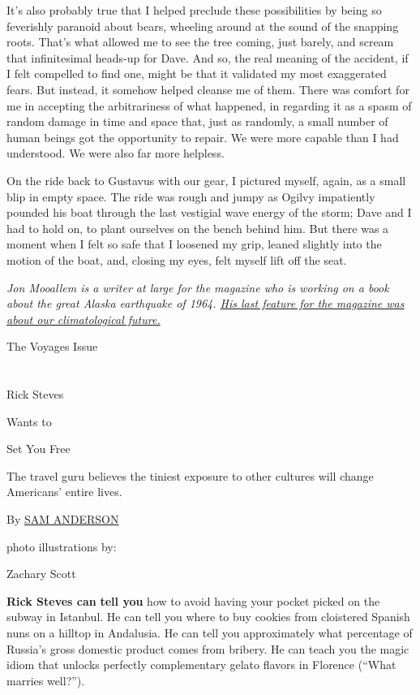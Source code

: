 It's also probably true that I helped preclude these possibilities by
being so feverishly paranoid about bears, wheeling around at the sound
of the snapping roots. That's what allowed me to see the tree coming,
just barely, and scream that infinitesimal heads-up for Dave. And so,
the real meaning of the accident, if I felt compelled to find one, might
be that it validated my most exaggerated fears. But instead, it somehow
helped cleanse me of them. There was comfort for me in accepting the
arbitrariness of what happened, in regarding it as a spasm of random
damage in time and space that, just as randomly, a small number of human
beings got the opportunity to repair. We were more capable than I had
understood. We were also far more helpless.

On the ride back to Gustavus with our gear, I pictured myself, again, as
a small blip in empty space. The ride was rough and jumpy as Ogilvy
impatiently pounded his boat through the last vestigial wave energy of
the storm; Dave and I had to hold on, to plant ourselves on the bench
behind him. But there was a moment when I felt so safe that I loosened
my grip, leaned slightly into the motion of the boat, and, closing my
eyes, felt myself lift off the seat.

\emph{Jon Mooallem is a writer at large for the magazine who is working
on a book about the great Alaska earthquake of 1964.
\href{https://www.nytimes3xbfgragh.onion/2017/04/19/magazine/our-climate-future-is-actually-our-climate-present.html}{His
last feature for the magazine was about our climatological future.}}

The Voyages Issue

\hypertarget{-3}{%
\section{}\label{-3}}

Rick Steves

Wants to

Set You Free

 The travel guru believes the tiniest exposure to other cultures will
change Americans' entire lives.

By \href{https://www.nytimes3xbfgragh.onion/by/sam-anderson}{SAM
ANDERSON}

photo illustrations by:

Zachary Scott

\textbf{Rick Steves can} \textbf{tell you} how to avoid having your
pocket picked on the subway in Istanbul. He can tell you where to buy
cookies from cloistered Spanish nuns on a hilltop in Andalusia. He can
tell you approximately what percentage of Russia's gross domestic
product comes from bribery. He can teach you the magic idiom that
unlocks perfectly complementary gelato flavors in Florence (``What
marries well?'').

